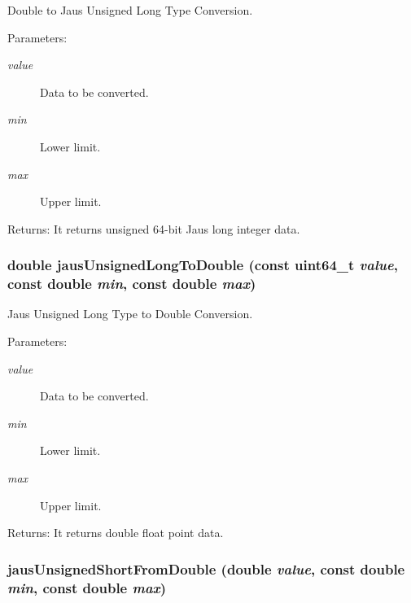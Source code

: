 Double to Jaus Unsigned Long Type Conversion. 

\begin{Desc}
\item[Parameters:]
\begin{description}
\item[{\em value}]Data to be converted. \item[{\em min}]Lower limit. \item[{\em max}]Upper limit.\end{description}
\end{Desc}
\begin{Desc}
\item[Returns:]It returns unsigned 64-bit Jaus long integer data. \end{Desc}
\hypertarget{group__data__conv_g778c5ff4cb41a0ba9464a721bd14ef57}{
\subsubsection[jausUnsignedLongToDouble]{\setlength{\rightskip}{0pt plus 5cm}double jausUnsignedLongToDouble (const {\bf uint64\_\-t} {\em value}, \/  const double {\em min}, \/  const double {\em max})}}
\label{group__data__conv_g778c5ff4cb41a0ba9464a721bd14ef57}


Jaus Unsigned Long Type to Double Conversion. 

\begin{Desc}
\item[Parameters:]
\begin{description}
\item[{\em value}]Data to be converted. \item[{\em min}]Lower limit. \item[{\em max}]Upper limit.\end{description}
\end{Desc}
\begin{Desc}
\item[Returns:]It returns double float point data. \end{Desc}
\hypertarget{group__data__conv_g1bd4561881610850037b611c4e1df1d0}{
\subsubsection[jausUnsignedShortFromDouble]{ jausUnsignedShortFromDouble (double {\em value}, \/  const double {\em min}, \/  const double {\em max})}}
\label{group__data__conv_g1bd4561881610850037b611c4e1df1d0}



